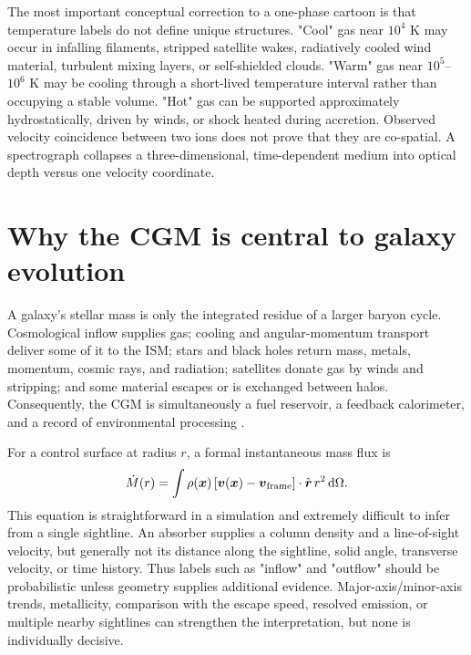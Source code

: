 The most important conceptual correction to a one-phase cartoon is that
temperature labels do not define unique structures. "Cool" gas near
$10^{4}$ K may occur in infalling filaments, stripped satellite wakes,
radiatively cooled wind material, turbulent mixing layers, or self-shielded
clouds. "Warm" gas near $10^{5}$--$10^{6}$ K may be cooling through a
short-lived temperature interval rather than occupying a stable volume.
"Hot" gas can be supported approximately hydrostatically, driven by winds,
or shock heated during accretion. Observed velocity coincidence between two
ions does not prove that they are co-spatial. A spectrograph collapses a
three-dimensional, time-dependent medium into optical depth versus one
velocity coordinate.

\section{Why the CGM is central to galaxy evolution}

A galaxy's stellar mass is only the integrated residue of a larger baryon
cycle. Cosmological inflow supplies gas; cooling and angular-momentum
transport deliver some of it to the ISM; stars and black holes return mass,
metals, momentum, cosmic rays, and radiation; satellites donate gas by winds
and stripping; and some material escapes or is exchanged between halos.
Consequently, the CGM is simultaneously a fuel reservoir, a feedback
calorimeter, and a record of environmental processing
\citep{Tumlinson2017,FaucherGiguereOh2023,Hafen2019}.

For a control surface at radius $r$, a formal instantaneous mass flux is
\begin{equation}
 \dot{M}(r)=\int \rho(\boldsymbol{x})
        \left[\boldsymbol{v}(\boldsymbol{x})-\boldsymbol{v}_{\rm frame}\right]
        \cdot \hat{\boldsymbol{r}}\,r^{2}\,{\rm d}\Omega .
 \label{eq:mass-flux}
\end{equation}
This equation is straightforward in a simulation and extremely difficult to
infer from a single sightline. An absorber supplies a column density and a
line-of-sight velocity, but generally not its distance along the sightline,
solid angle, transverse velocity, or time history. Thus labels such as
"inflow" and "outflow" should be probabilistic unless geometry supplies
additional evidence. Major-axis/minor-axis trends, metallicity, comparison
with the escape speed, resolved emission, or multiple nearby sightlines can
strengthen the interpretation, but none is individually decisive.

